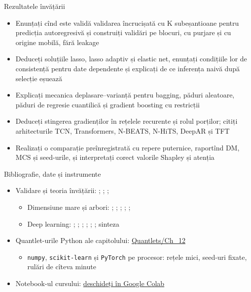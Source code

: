 \begin{frame}{Rezultatele învățării}
\itemsize{\small}
\begin{itemize}
    \item Enunțați cînd este validă validarea încrucișată cu K subeșantioane pentru predicția autoregresivă și construiți validări pe blocuri, cu purjare și cu origine mobilă, fără leakage
    \item Deduceți soluțiile lasso, lasso adaptiv și elastic net, enunțați condițiile lor de consistență pentru date dependente și explicați de ce inferența naivă după selecție eșuează
    \item Explicați mecanica deplasare--varianță pentru bagging, păduri aleatoare, păduri de regresie cuantilică și gradient boosting cu restricții
    \item Deduceți stingerea gradienților în rețelele recurente și rolul porților; citiți arhitecturile TCN, Transformers, N-BEATS, N-HiTS, DeepAR și TFT
    \item Realizați o comparație preînregistrată cu repere puternice, raportînd DM, MCS și seed-urile, și interpretați corect valorile Shapley și atenția
\end{itemize}
\end{frame}

\begin{frame}{Bibliografie, date și instrumente}
\itemsize{\small}
\begin{itemize}
    \item Validare și teoria învățării: ; ; ; 
    \begin{itemize}
        \item Dimensiune mare și arbori: ; ; ; ; ; 
        \item Deep learning: ; ; ; ; ; ; sinteza 
    \end{itemize}
    \item Quantlet-urile Python ale capitolului: \href{https://github.com/danpele/Advanced-Time-Series/tree/main/Quantlets/Ch_12}{Quantlets/Ch\_12}
    \begin{itemize}
        \item \texttt{numpy}, \texttt{scikit-learn} și \texttt{PyTorch} pe procesor: rețele mici, seed-uri fixate, rulări de cîteva minute
    \end{itemize}
    \item Notebook-ul cursului: \href{\colaburl{notebooks/EN/chapter12_lecture_notebook.ipynb}}{deschideți în Google Colab}
\end{itemize}
\end{frame}

